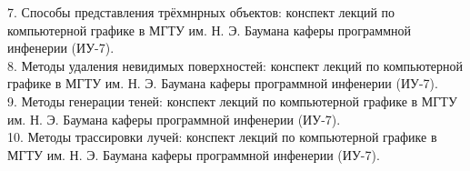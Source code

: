 \hspace{-1.25cm}
7. Способы представления трёхмнрных объектов:
конспект лекций по компьютерной графике в МГТУ им. Н. Э. Баумана
каферы программной инфенерии (ИУ-7). \\

\hspace{-1.25cm}
8. Методы удаления невидимых поверхностей:
конспект лекций по компьютерной графике в МГТУ им. Н. Э. Баумана
каферы программной инфенерии (ИУ-7). \\

\hspace{-1.25cm}
9. Методы генерации теней:
конспект лекций по компьютерной графике в МГТУ им. Н. Э. Баумана
каферы программной инфенерии (ИУ-7). \\

\hspace{-1.25cm}
10. Методы трассировки лучей:
конспект лекций по компьютерной графике в МГТУ им. Н. Э. Баумана
каферы программной инфенерии (ИУ-7). \\